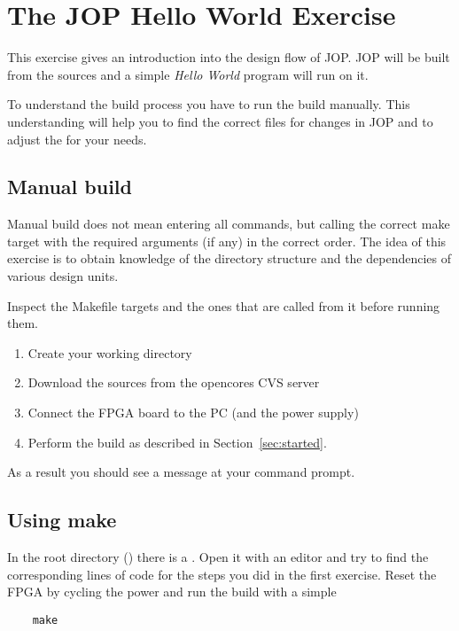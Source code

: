 \section{The JOP Hello World Exercise}

This exercise gives an introduction into the design flow of JOP. JOP
will be built from the sources and a simple \emph{Hello World}
program will run on it.

To understand the build process you have to run the build manually.
This understanding will help you to find the correct files for
changes in JOP and to adjust the  for your needs.

\subsection{Manual build}

Manual build does not mean entering all commands, but calling the
correct make target with the required arguments (if any) in the
correct order. The idea of this exercise is to obtain knowledge of
the directory structure and the dependencies of various design units.

Inspect the Makefile targets and the ones that are called from it
before running them.

\begin{enumerate}
    \item Create your working directory
    \item Download the sources from the opencores CVS server
    \item Connect the FPGA board to the PC (and the power supply)
    \item Perform the build as described in
        Section~\ref{sec:started}.
\end{enumerate}

As a result you should see a message at your command prompt.

\subsection{Using make}

In the root directory () there is a . Open
it with an editor and try to find the corresponding lines of code for
the steps you did in the first exercise. Reset the FPGA by cycling
the power and run the build with a simple
\begin{lstlisting}
    make
\end{lstlisting}

